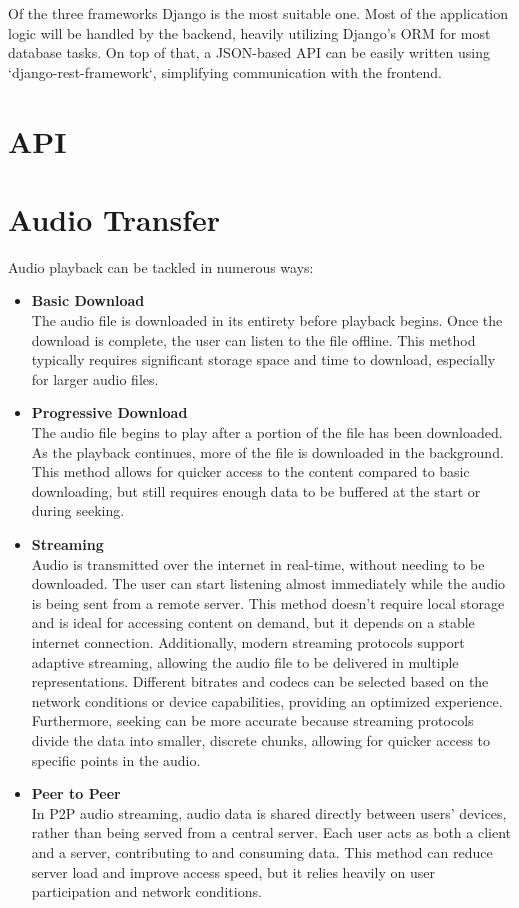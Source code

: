 Of the three frameworks Django is the most suitable one.
Most of the application logic will be handled by the backend, heavily utilizing
Django's ORM for most database tasks. On top of that, a JSON-based API can be easily written
using `django-rest-framework`, simplifying communication with the frontend.


\section{API}


\section{Audio Transfer}

Audio playback can be tackled in numerous ways:

\begin{itemize}
    \item \textbf{Basic Download}\\
    The audio file is downloaded in its entirety before playback begins.
    Once the download is complete, the user can listen to the file offline.
    This method typically requires significant storage space and time to download,
    especially for larger audio files.

    \item \textbf{Progressive Download}\\
    The audio file begins to play after a portion of the file
    has been downloaded. As the playback continues, more of the file is downloaded
    in the background. This method allows for quicker access to the content
    compared to basic downloading, but still requires enough data to be buffered at the start or during seeking.

    \item \textbf{Streaming}\\
    Audio is transmitted over the internet in real-time, without needing
    to be downloaded. The user can start listening almost immediately while the audio is being
    sent from a remote server. This method doesn’t require local storage and is
    ideal for accessing content on demand, but it depends on a stable internet connection.
    Additionally, modern streaming protocols support adaptive streaming, allowing the audio file
    to be delivered in multiple representations. Different bitrates and codecs can be
    selected based on the network conditions or device capabilities, providing an optimized experience.
    Furthermore, seeking can be more accurate because streaming protocols divide the data into
    smaller, discrete chunks, allowing for quicker access to specific points in the audio.

    \item \textbf{Peer to Peer}\\
    In P2P audio streaming, audio data is shared directly between users'
    devices, rather than being served from a central server.
    Each user acts as both a client and a server, contributing to and consuming
    data. This method can reduce server load and improve access speed,
    but it relies heavily on user participation and network conditions.
\end{itemize}

